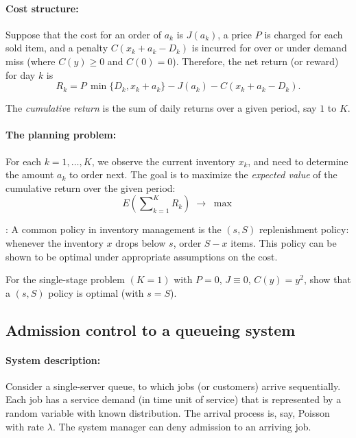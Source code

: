\paragraph{Cost structure:} Suppose that the cost for an order of $a_k$ is $J(a_k)$, a price $P$ is charged for each sold item, and a penalty $C({x_k} + {a_k} - {D_k})$ is incurred for over or under demand miss (where $C(y) \ge 0$ and  $C(0) = 0$).   Therefore, the net return (or reward) for day $k$ is \[{R_k} = P\,\min \{ {D_k},{x_k} + {a_k}\}  - J({a_k}) - C({x_k} + {a_k} - {D_k}).\]

The \emph{cumulative return} is the sum of daily returns over a given period, say $1$ to $K$.

\paragraph{The planning problem:} For each $k = 1, \ldots ,K$, we observe the current inventory $x_k$, and need to determine the amount $a_k$ to order next. The goal is to maximize the \emph{expected value} of the cumulative return over the given period:
\[E(\sum\nolimits_{k = 1}^K {{R_k}} )\; \to \;\max \]

\begin{remark}: A common policy in inventory management is the $(s,S)$ replenishment policy: whenever the inventory $x$ drops below $s$, order $S-x$ items. This policy can be shown to be optimal under appropriate assumptions on the cost.
\end{remark}
\begin{exercise} For the single-stage problem $(K=1)$  with $P=0$, $J\equiv0$, $C(y)=y^2$, show that a $(s,S)$ policy is optimal (with $s=S$).
\end{exercise}

\subsection{Admission control to a queueing system}
\paragraph{System description:} Consider a single-server queue, to which jobs (or customers) arrive sequentially. Each job has a service demand (in time unit of service) that is represented by a random variable with known distribution. The arrival process is, say, Poisson with rate $\lambda$.  The system manager can deny admission to an arriving job.

